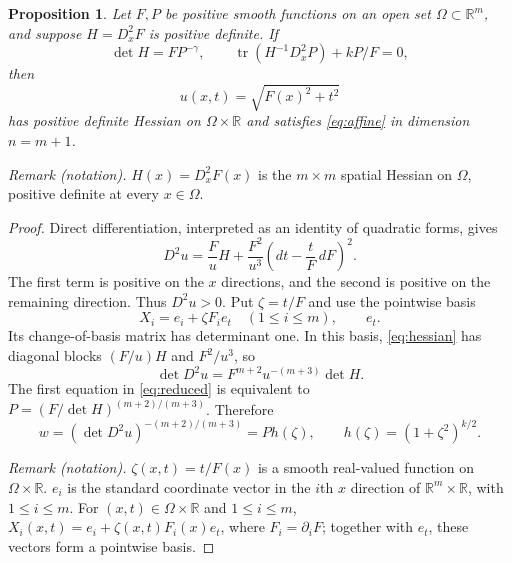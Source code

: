 \documentclass[11pt]{article}
\newcommand{\R}{\mathbb R}
\DeclareMathOperator{\tr}{tr}
\newtheorem{proposition}[theorem]{Proposition}
\theoremstyle{remark}
\begin{document}
\begin{proposition}\label{prop:reduction}
Let $F,P$ be positive smooth functions on an open set
$\Omega\subset\R^m$, and suppose $H=D_x^2F$ is positive definite.
If
\begin{equation}\label{eq:reduced}
 \det H=FP^{-\gamma},\qquad
 \tr(H^{-1}D_x^2P)+kP/F=0,
\end{equation}
then
\[
 u(x,t)=\sqrt{F(x)^2+t^2}
\]
has positive definite Hessian on $\Omega\times\R$ and satisfies
\eqref{eq:affine} in dimension $n=m+1$.
\end{proposition}

\noindent\textit{Remark (notation).} $H(x)=D_x^2F(x)$ is the $m\times m$ spatial Hessian on $\Omega$, positive definite at every $x\in\Omega$.

\begin{proof}
Direct differentiation, interpreted as an identity of quadratic
forms, gives
\begin{equation}\label{eq:hessian}
 D^2u=\frac Fu H+\frac{F^2}{u^3}
          \left(dt-\frac tF\,dF\right)^2.
\end{equation}
The first term is positive on the $x$ directions, and the second
is positive on the remaining direction.  Thus $D^2u>0$.
Put $\zeta=t/F$ and use the pointwise basis
\[
 X_i=e_i+\zeta F_i e_t\quad(1\leq i\leq m),\qquad e_t.
\]
Its change-of-basis matrix has determinant one.  In this basis,
\eqref{eq:hessian} has diagonal blocks $(F/u)H$ and $F^2/u^3$,
so
\begin{equation}\label{eq:det}
 \det D^2u=F^{m+2}u^{-(m+3)}\det H.
\end{equation}
The first equation in \eqref{eq:reduced} is equivalent to
$P=(F/\det H)^{(m+2)/(m+3)}$.  Therefore
\begin{equation}\label{eq:w}
 w=(\det D^2u)^{-(m+2)/(m+3)}=P h(\zeta),
 \qquad h(\zeta)=(1+\zeta^2)^{k/2}.
\end{equation}

\noindent\textit{Remark (notation).} $\zeta(x,t)=t/F(x)$ is a smooth real-valued function on $\Omega\times\R$. $e_i$ is the standard coordinate vector in the $i$th $x$ direction of $\R^m\times\R$, with $1\leq i\leq m$. For $(x,t)\in\Omega\times\R$ and $1\leq i\leq m$, $X_i(x,t)=e_i+\zeta(x,t)F_i(x)e_t$, where $F_i=\partial_iF$; together with $e_t$, these vectors form a pointwise basis.



\end{proof}
\end{document}
